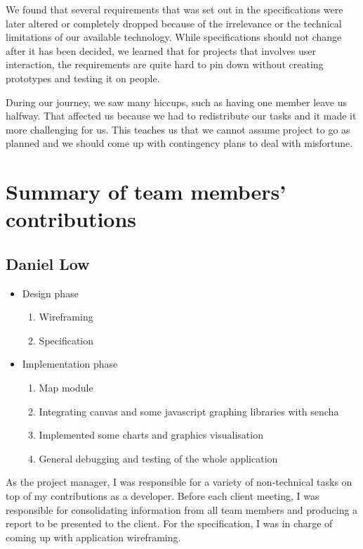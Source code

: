 \documentclass[12pt,a4paper,twoside]{article}
\begin{document}
We found that several requirements that was set out in the specifications were later altered or completely dropped because of the irrelevance or the technical limitations of our available technology. While specifications should not change after it has been decided, we learned that for projects that involves user interaction, the requirements are quite hard to pin down without creating prototypes and testing it on people.

During our journey, we saw many hiccups, such as having one member leave us halfway. That affected us because we had to redistribute our tasks and it made it more challenging for us. This teaches us that we cannot assume project to go as planned and we should come up with contingency plans to deal with misfortune.

\section{Summary of team members' contributions}

\subsection{Daniel Low}

\begin{itemize}
	\item Design phase
	\begin{enumerate}
		\item Wireframing
		\item Specification
	\end{enumerate}
	\item Implementation phase
	\begin{enumerate}
		\item Map module
		\item Integrating canvas and some javascript graphing libraries with sencha
		\item Implemented some charts and graphics visualisation
		\item General debugging and testing of the whole application
	\end{enumerate}
\end{itemize}

As the project manager, I was responsible for a variety of non-technical tasks on top of my contributions as a developer. Before each client meeting, I was responsible for consolidating information from all team members and producing a report to be presented to the client. For the specification, I was in charge of coming up with application wireframing. 
\end{document}
